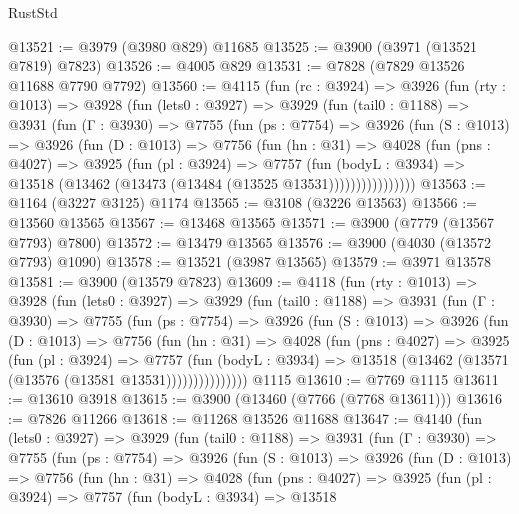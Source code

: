 \begin{lexlean}{RustStd}
\begin{coremodule}
@13521 := @3979 (@3980 @829) @11685
@13525 := @3900 (@3971 (@13521 @7819) @7823)
@13526 := @4005 @829
@13531 := @7828 (@7829 @13526 @11688 @7790 @7792)
@13560 := @4115
    (fun (rc : @3924) =>
    @3926
      (fun (rty : @1013) =>
      @3928
        (fun (lets0 : @3927) =>
        @3929
          (fun (tail0 : @1188) =>
          @3931
            (fun (Γ : @3930) =>
            @7755
              (fun (ps : @7754) =>
              @3926
                (fun (S : @1013) =>
                @3926
                  (fun (D : @1013) =>
                  @7756
                    (fun (hn : @31) =>
                    @4028
                      (fun (pns : @4027) =>
                      @3925
                        (fun (pl : @3924) =>
                        @7757
                          (fun (bodyL : @3934) =>
                          @13518 (@13462 (@13473 (@13484 (@13525 @13531))))))))))))))))
@13563 := @1164 (@3227 @3125) @1174
@13565 := @3108 (@3226 @13563)
@13566 := @13560 @13565
@13567 := @13468 @13565
@13571 := @3900 (@7779 (@13567 @7793) @7800)
@13572 := @13479 @13565
@13576 := @3900 (@4030 (@13572 @7793) @1090)
@13578 := @13521 (@3987 @13565)
@13579 := @3971 @13578
@13581 := @3900 (@13579 @7823)
@13609 := @4118
    (fun (rty : @1013) =>
    @3928
      (fun (lets0 : @3927) =>
      @3929
        (fun (tail0 : @1188) =>
        @3931
          (fun (Γ : @3930) =>
          @7755
            (fun (ps : @7754) =>
            @3926
              (fun (S : @1013) =>
              @3926
                (fun (D : @1013) =>
                @7756
                  (fun (hn : @31) =>
                  @4028
                    (fun (pns : @4027) =>
                    @3925
                      (fun (pl : @3924) =>
                      @7757
                        (fun (bodyL : @3934) =>
                        @13518 (@13462 (@13571 (@13576 (@13581 @13531)))))))))))))))
    @1115
@13610 := @7769 @1115
@13611 := @13610 @3918
@13615 := @3900 (@13460 (@7766 (@7768 @13611)))
@13616 := @7826 @11266
@13618 := @11268 @13526 @11688
@13647 := @4140
    (fun (lets0 : @3927) =>
    @3929
      (fun (tail0 : @1188) =>
      @3931
        (fun (Γ : @3930) =>
        @7755
          (fun (ps : @7754) =>
          @3926
            (fun (S : @1013) =>
            @3926
              (fun (D : @1013) =>
              @7756
                (fun (hn : @31) =>
                @4028
                  (fun (pns : @4027) =>
                  @3925
                    (fun (pl : @3924) =>
                    @7757
                      (fun (bodyL : @3934) =>
                      @13518

\end{coremodule}
\end{lexlean}
